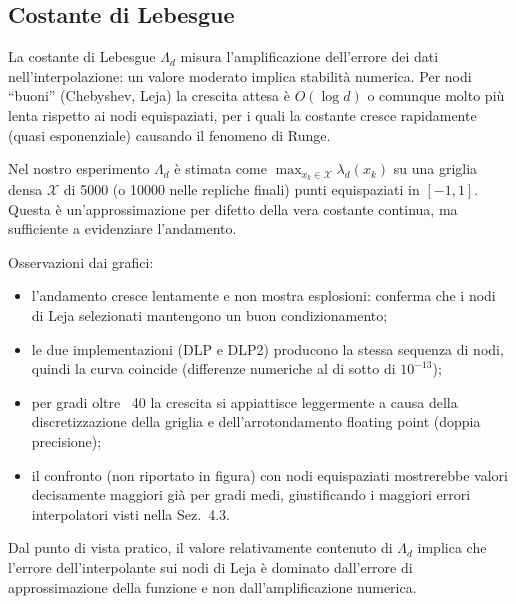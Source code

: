 \documentclass[12pt]{article}
\begin{document}
\subsection{Costante di Lebesgue}
La costante di Lebesgue \(\Lambda_d\) misura l'amplificazione dell'errore dei dati nell'interpolazione: un valore moderato implica stabilità numerica. Per nodi ``buoni'' (Chebyshev, Leja) la crescita attesa è \(O(\log d)\) o comunque molto più lenta rispetto ai nodi equispaziati, per i quali la costante cresce rapidamente (quasi esponenziale) causando il fenomeno di Runge.

Nel nostro esperimento \(\Lambda_d\) è stimata come \(\max_{x_k\in \mathcal X}\lambda_d(x_k)\) su una griglia densa \(\mathcal X\) di 5000 (o 10000 nelle repliche finali) punti equispaziati in \([-1,1]\). Questa è un'approssimazione per difetto della vera costante continua, ma sufficiente a evidenziare l'andamento.

Osservazioni dai grafici:
\begin{itemize}
  \item l'andamento cresce lentamente e non mostra esplosioni: conferma che i nodi di Leja selezionati mantengono un buon condizionamento;
  \item le due implementazioni (DLP e DLP2) producono la stessa sequenza di nodi, quindi la curva coincide (differenze numeriche al di sotto di \(10^{-13}\));
  \item per gradi oltre ~40 la crescita si appiattisce leggermente a causa della discretizzazione della griglia e dell'arrotondamento floating point (doppia precisione);
  \item il confronto (non riportato in figura) con nodi equispaziati mostrerebbe valori decisamente maggiori già per gradi medi, giustificando i maggiori errori interpolatori visti nella Sez.~4.3.
\end{itemize}

Dal punto di vista pratico, il valore relativamente contenuto di \(\Lambda_d\) implica che l'errore dell'interpolante sui nodi di Leja è dominato dall'errore di approssimazione della funzione e non dall'amplificazione numerica.
\end{document}
